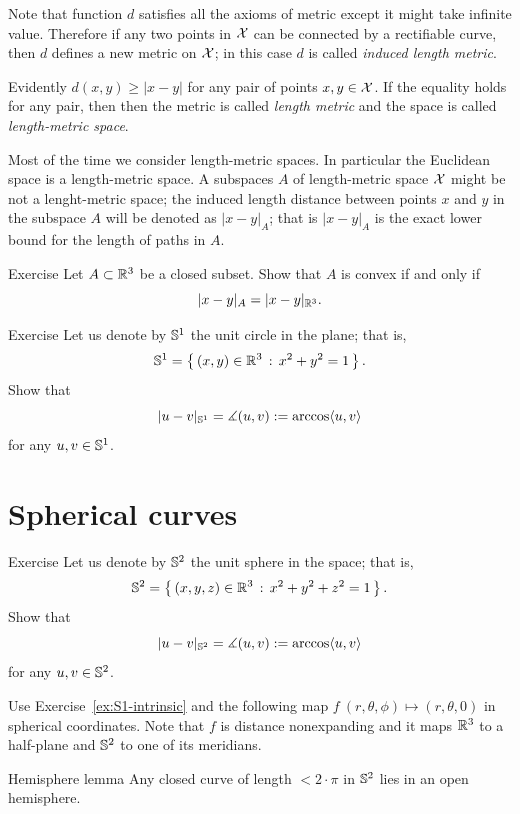 Note that function $d$ satisfies all the axioms of metric except it might take infinite value.
Therefore if any two points in $\mathcal{X}$ can be connected by a rectifiable curve, then $d$ defines a new metric on $\mathcal{X}$; in this case $d$ is called \emph{induced length metric}.

Evidently $d(x,y)\ge |x-y|$ for any pair of points $x,y\in \mathcal{X}$.
If the equality holds for any pair, then then the metric is called \emph{length metric} and the space is called \emph{length-metric space}.

Most of the time we consider length-metric spaces.
In particular the Euclidean space is a length-metric space.
A subspaces $A$ of length-metric space $\mathcal{X}$ might be not a lenght-metric space;
the induced length distance between points $x$ and $y$ in the subspace $A$ will be denoted as $|x-y|_A$;
that is $|x-y|_A$ is the exact lower bound for the length of paths in $A$.

\begin{thm}{Exercise}\label{ex:intrinsic-convex}
Let $A\subset \mathbb{R}^3$ be a closed subset.
Show that $A$ is convex if and only if
\[|x-y|_A=|x-y|_{\mathbb{R}^3}.\]
\end{thm}

\begin{thm}{Exercise}\label{ex:S1-intrinsic}
Let us denote by $\mathbb{S}^1$ the unit circle in the plane; that is,
\[\mathbb{S}^1=\left\{\,{(x,y)\in\mathbb{R}^3}\,:\,{x^2+y^2=1}\,\right\}.\]
Show that
\[|u-v|_{\mathbb{S}^1}=\measuredangle(u,v):=\arccos\langle u,v\rangle\]
for any $u,v\in \mathbb{S}^1$.
\end{thm}

\section*{Spherical curves}

\begin{thm}{Exercise}\label{ex:S2-intrinsic}
Let us denote by $\mathbb{S}^2$ the unit sphere in the space; that is,
\[\mathbb{S}^2=\left\{\,{(x,y,z)\in\mathbb{R}^3}\,:\,{x^2+y^2+z^2=1}\,\right\}.\]
Show that
\[|u-v|_{\mathbb{S}^2}=\measuredangle(u,v):=\arccos\langle u,v\rangle\]
for any $u,v\in \mathbb{S}^2$.
\end{thm}

 Use Exercise~\ref{ex:S1-intrinsic} and the following map $f\:(r,\theta,\phi)\mapsto (r,\theta,0)$ in spherical coordinates. Note that $f$ is distance nonexpanding and it maps $\mathbb{R}^3$ to a half-plane and $\mathbb{S}^2$ to one of its meridians.

\begin{thm}{Hemisphere lemma}
\label{lem:hemisphere}
Any closed curve of length $<2\cdot \pi$ in $\mathbb{S}^2$ lies in an open hemisphere. 
\end{thm}

